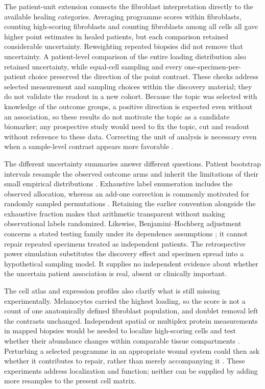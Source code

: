 The patient-unit extension connects the fibroblast interpretation directly to the available healing categories. Averaging programme scores within fibroblasts, counting high-scoring fibroblasts and counting fibroblasts among all cells all gave higher point estimates in healed patients, but each comparison retained considerable uncertainty. Reweighting repeated biopsies did not remove that uncertainty. A patient-level comparison of the entire loading distribution also retained uncertainty, while equal-cell sampling and every one-specimen-per-patient choice preserved the direction of the point contrast. These checks address selected measurement and sampling choices within the discovery material; they do not validate the readout in a new cohort. Because the topic was selected with knowledge of the outcome groups, a positive direction is expected even without an association, so these results do not motivate the topic as a candidate biomarker; any prospective study would need to fix the topic, cut and readout without reference to these data. Correcting the unit of analysis is necessary even when a sample-level contrast appears more favorable \citep{squair2021,zimmerman2021}.

The different uncertainty summaries answer different questions. Patient bootstrap intervals resample the observed outcome arms and inherit the limitations of their small empirical distributions \citep{efron1993}. Exhaustive label enumeration includes the observed allocation, whereas an add-one correction is commonly motivated for randomly sampled permutations \citep{phipson2010,hemerik2018}. Retaining the earlier convention alongside the exhaustive fraction makes that arithmetic transparent without making observational labels randomized. Likewise, Benjamini--Hochberg adjustment concerns a stated testing family under its dependence assumptions \citep{benjamini1995}; it cannot repair repeated specimens treated as independent patients. The retrospective power simulation substitutes the discovery effect and specimen spread into a hypothetical sampling model. It supplies no independent evidence about whether the uncertain patient association is real, absent or clinically important.

The cell atlas and expression profiles also clarify what is still missing experimentally. Melanocytes carried the highest loading, so the score is not a count of one anatomically defined fibroblast population, and doublet removal left the contrasts unchanged. Independent spatial or multiplex protein measurements in mapped biopsies would be needed to localize high-scoring cells and test whether their abundance changes within comparable tissue compartments \citep{foster2021,philippeos2018}. Perturbing a selected programme in an appropriate wound system could then ask whether it contributes to repair, rather than merely accompanying it \citep{mascharak2021}. These experiments address localization and function; neither can be supplied by adding more resamples to the present cell matrix.

